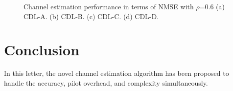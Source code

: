 \documentclass[lettersize,journal]{IEEEtran}
\begin{document}
\begin{figure}[!t]
\centering
{}
\hfil
{}
\caption{Channel estimation performance in terms of NMSE with $\rho$=0.6 (a) CDL-A. (b) CDL-B. (c) CDL-C. (d) CDL-D.}
\label{fig_sim}
\end{figure}

\section{Conclusion}


In this letter, the novel channel estimation algorithm has been proposed to handle the accuracy, pilot overhead, and complexity simultaneously.




\end{document}
